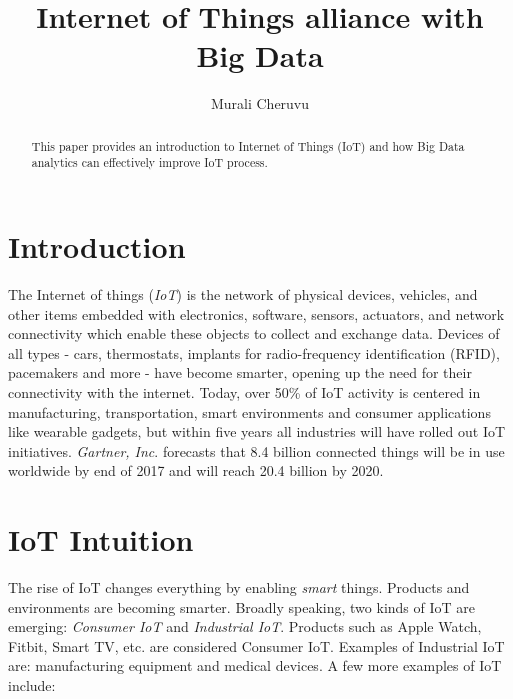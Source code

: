 \documentclass[sigconf]{acmart}
\begin{document}
\title{Internet of Things alliance with Big Data}


\author{Murali Cheruvu}

\renewcommand{\shortauthors}{M. Cheruvu}


\begin{abstract}
This paper provides an introduction to Internet of Things (IoT) and how Big Data analytics can effectively improve IoT process.
\end{abstract}



\maketitle

\section{Introduction}

The Internet of things ({\em IoT}) is the network of physical devices, vehicles, and other items embedded with electronics, software, sensors, actuators, and network connectivity which enable these objects to collect and exchange data\cite{1_wiki_iot}. Devices of all types - cars, thermostats, implants for radio-frequency identification (RFID), pacemakers and more - have become smarter, opening up the need for their connectivity with the internet. Today, over 50\% of IoT activity is centered in manufacturing, transportation, smart environments and consumer applications like wearable gadgets, but within five years all industries will have rolled out IoT initiatives. {\em Gartner, Inc}. forecasts that 8.4 billion connected things will be in use worldwide by end of 2017 and will reach 20.4 billion by 2020\cite{2_Gartner}. 

\section{IoT Intuition}

The rise of IoT changes everything by enabling {\em smart} things. Products and environments are becoming smarter. Broadly speaking, two kinds of IoT are emerging: {\em Consumer IoT} and {\em Industrial IoT}. Products such as Apple Watch, Fitbit, Smart TV, etc. are considered Consumer IoT. Examples of Industrial IoT are: manufacturing equipment and medical devices. A few more examples of IoT include:
\end{document}
